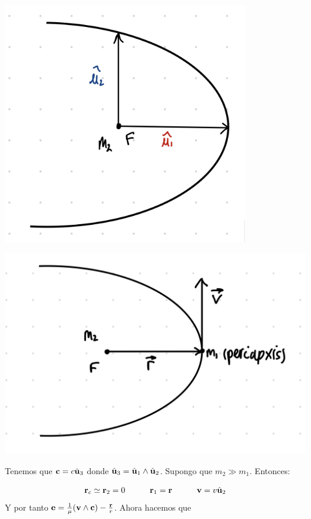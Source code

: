 	\begin{minipage}{.45\textwidth}
		\includegraphics[width=0.8\textwidth]{Cuerpo/Imagenes/02_Ejercicio_1_1.jpg}
	\end{minipage}	\hfill
	\begin{minipage}{0.45\textwidth}
		\includegraphics[width=1.0\textwidth]{Cuerpo/Imagenes/02_Ejercicio_1_2.png}
	\end{minipage}

	Tenemos que $\mathbf{c}=c\hat{\mathbf{u}}_3$ donde $\hat{\mathbf{u}}_3=\hat{\mathbf{u}}_1\wedge\hat{\mathbf{u}}_2$. Supongo que $m_2\gg m_1$. Entonces:

	\begin{equation}
		\mathbf{r}_c \simeq \mathbf{r}_2 = 0 \quad \quad \quad \mathbf{r}_1 = \mathbf{r} \quad \quad \quad \mathbf{v} = v \hat{\mathbf{u}}_2
	\end{equation}
	Y por tanto $\mathbf{e}=\frac{1}{\mu} (\mathbf{v} \wedge \mathbf{c}) - \frac{\mathbf{r}}{r}$. Ahora hacemos que

